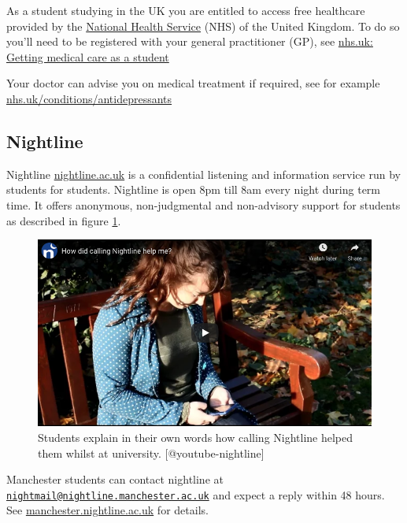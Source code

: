 \documentclass[
]{book}
\begin{document}
As a student studying in the UK you are entitled to access free healthcare provided by the \href{https://en.wikipedia.org/wiki/National_Health_Service}{National Health Service} (NHS) of the United Kingdom. To do so you'll need to be registered with your general practitioner (GP), see \href{https://www.nhs.uk/live-well/healthy-body/getting-medical-care-as-a-student/}{nhs.uk: Getting medical care as a student}

Your doctor can advise you on medical treatment if required, see for example \href{https://www.nhs.uk/conditions/antidepressants/}{nhs.uk/conditions/antidepressants}

\hypertarget{nightline}{%
\subsection{Nightline}\label{nightline}}

Nightline \href{https://www.nightline.ac.uk}{nightline.ac.uk} is a confidential listening and information service run by students for students. Nightline is open 8pm till 8am every night during term time. It offers anonymous, non-judgmental and non-advisory support for students as described in figure \ref{fig:nightline-fig}.

\begin{figure}

{\centering \includegraphics[width=0.99\linewidth]{images/youtube-nightline} 

}

\caption{Students explain in their own words how calling Nightline helped them whilst at university. [@youtube-nightline]}\label{fig:nightline-fig}
\end{figure}

Manchester students can contact nightline at \href{mailto:nightmail@nightline.manchester.ac.uk}{\nolinkurl{nightmail@nightline.manchester.ac.uk}} and expect a reply within 48 hours. See \href{https://manchester.nightline.ac.uk/}{manchester.nightline.ac.uk} for details.
\end{document}
